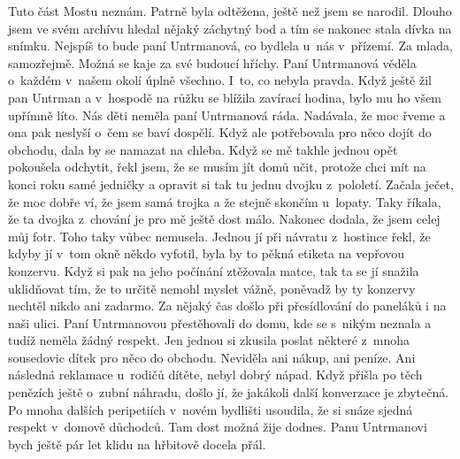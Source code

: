 
Tuto část Mostu neznám. Patrně byla odtěžena, ještě než jsem se
narodil. Dlouho jsem ve svém archívu hledal nějaký záchytný bod a tím
se nakonec stala dívka na snímku. Nejspíš to bude paní Untrmanová, co
bydlela u~nás v~přízemí. Za mlada, samozřejmě. Možná se kaje za své
budoucí hříchy. Paní Untrmanová věděla o~každém v~našem okolí úplně
všechno. I~to, co nebyla pravda. Když ještě žil pan Untrman a
v~hospodě na růžku se blížila zavírací hodina, bylo mu ho všem upřímně
líto. Nás děti neměla paní Untrmanová ráda. Nadávala, že moc řveme a
ona pak neslyší o~čem se baví dospělí. Když ale potřebovala pro něco
dojít do obchodu, dala by se namazat na chleba. Když se mě takhle
jednou opět pokoušela odchytit, řekl jsem, že se musím jít domů učit,
protože chci mít na konci roku samé jedničky a opravit si tak tu jednu
dvojku z~pololetí. Začala ječet, že moc dobře ví, že jsem samá trojka
a že stejně skončím u~lopaty. Taky říkala, že ta dvojka z~chování je
pro mě ještě dost málo. Nakonec dodala, že jsem celej můj fotr. Toho
taky vůbec nemusela. Jednou jí při návratu z~hostince řekl, že kdyby
jí v~tom okně někdo vyfotil, byla by to pěkná etiketa na vepřovou
konzervu. Když si pak na jeho počínání ztěžovala matce, tak ta se jí
snažila uklidňovat tím, že to určitě nemohl myslet vážně, poněvadž by
ty konzervy nechtěl nikdo ani zadarmo. Za nějaký čas došlo při
přesídlování do paneláků i na naši ulici. Paní Untrmanovou
přestěhovali do domu, kde se s~nikým neznala a tudíž neměla žádný
respekt. Jen jednou si zkusila poslat některé z~mnoha sousedovic dítek
pro něco do obchodu. Neviděla ani nákup, ani peníze. Ani následná
reklamace u~rodičů dítěte, nebyl dobrý nápad. Když přišla po těch
penězích ještě o~zubní náhradu, došlo jí, že jakákoli další konverzace
je zbytečná. Po mnoha dalších peripetiích v~novém bydlišti usoudila,
že si snáze sjedná respekt v~domově důchodců. Tam dost možná žije
dodnes. Panu Untrmanovi bych ještě pár let klidu na hřbitově docela
přál.


